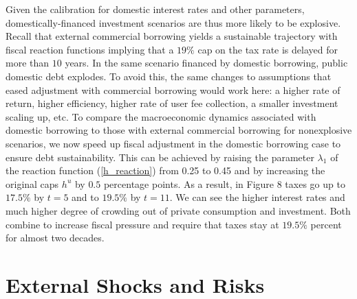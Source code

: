 \documentclass[11pt]{article}
\begin{document}
Given the calibration for domestic interest rates and other parameters,
domestically-financed investment scenarios are thus more likely to be
explosive. Recall that external commercial borrowing yields a sustainable
trajectory with fiscal reaction functions implying that a $19\%$ cap on the
tax rate is delayed for more than $10$ years. In the same scenario financed
by domestic borrowing, public domestic debt explodes. To avoid this, the
same changes to assumptions that eased adjustment with commercial borrowing
would work here: a higher rate of return, higher efficiency, higher rate of
user fee collection, a smaller investment scaling up, etc. To compare the
macroeconomic dynamics associated with domestic borrowing to those with
external commercial borrowing for nonexplosive scenarios, we now speed up
fiscal adjustment in the domestic borrowing case to ensure debt
sustainability. This can be achieved by raising the parameter $\lambda _{1}$
of the reaction function (\ref{h_reaction}) from 0.25 to 0.45 and by
increasing the original caps $h^{u}$ by $0.5$ percentage points. As a
result, in Figure 8 taxes go up to $17.5\%$ by $t=5$ and to $19.5\%$ by $%
t=11 $. We can see the higher interest rates and much higher degree of
crowding out of private consumption and investment. Both combine to increase
fiscal pressure and require that taxes stay at $19.5\%$ percent for almost
two decades.


\section{External Shocks and Risks}
\end{document}
